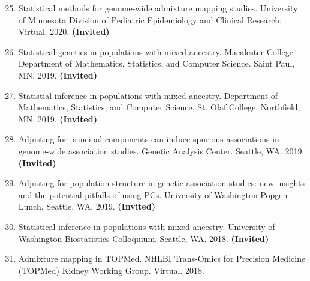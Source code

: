 \documentclass[margin]{res}
\newenvironment{benumerate}[1]{
    \let\oldItem\item
    \def\item{\addtocounter{enumi}{-2}\oldItem}
    
    \begin{enumerate}
    \setcounter{enumi}{#1}
    \addtocounter{enumi}{1}
}{
    \end{enumerate}
}
\begin{document}
\begin{resume}
\begin{benumerate}{24}
\item Statistical methods for genome-wide admixture mapping studies. University of Minnesota Division of Pediatric Epidemiology and Clinical Research. Virtual. 2020. \textbf{(Invited)}

\item Statistical genetics in populations with mixed ancestry. Macalester College Department of Mathematics, Statistics, and Computer Science. Saint Paul, MN. 2019. \textbf{(Invited)}

\item Statistial inference in populations with mixed ancestry. Department of Mathematics, Statistics, and Computer Science, St. Olaf College. Northfield, MN. 2019. \textbf{(Invited)}

\item Adjusting for principal components can induce spurious associations in genome-wide association studies. Genetic Analysis Center. Seattle, WA. 2019. \textbf{(Invited)}

\item Adjusting for population structure in genetic association studies: new insights and the potential pitfalls of using PCs. University of Washington Popgen Lunch. Seattle, WA. 2019.  \textbf{(Invited)}





\item %
Statistical inference in populations with mixed ancestry. University of Washington Biostatistics Colloquium. Seattle, WA. 2018.  \textbf{(Invited)}

\item Admixture mapping in TOPMed. NHLBI Trans-Omics for Precision Medicine (TOPMed) Kidney Working Group. Virtual. 2018.  



\end{benumerate}
\end{resume}
\end{document}
